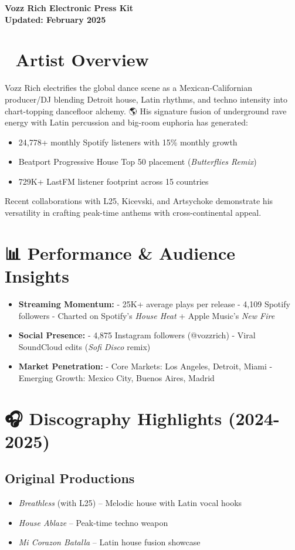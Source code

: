 \documentclass{article}
\begin{document}
  

{\centering\Large\bfseries Vozz Rich Electronic Press Kit \\  
\vspace{0.5em}  
\footnotesize Updated: February 2025\par}  

\section*{🎤 Artist Overview}  
Vozz Rich electrifies the global dance scene as a Mexican-Californian producer/DJ blending Detroit house, Latin rhythms, and techno intensity into chart-topping dancefloor alchemy. 🌎 His signature fusion of underground rave energy with Latin percussion and big-room euphoria has generated:  
\begin{itemize}  
\item 24,778+ monthly Spotify listeners with 15\% monthly growth  
\item Beatport Progressive House Top 50 placement (\textit{Butterflies Remix})  
\item 729K+ LastFM listener footprint across 15 countries  
\end{itemize}  
Recent collaborations with L25, Kicevski, and Artsychoke demonstrate his versatility in crafting peak-time anthems with cross-continental appeal.  

\section*{📊 Performance \& Audience Insights}  
\begin{itemize}  
\item \textbf{Streaming Momentum:}  
  - 25K+ average plays per release  
  - 4,109 Spotify followers  
  - Charted on Spotify's \textit{House Heat} + Apple Music's \textit{New Fire}  
\item \textbf{Social Presence:}  
  - 4,875 Instagram followers (@vozzrich)  
  - Viral SoundCloud edits (\textit{Sofi Disco} remix)  
\item \textbf{Market Penetration:}  
  - Core Markets: Los Angeles, Detroit, Miami  
  - Emerging Growth: Mexico City, Buenos Aires, Madrid  
\end{itemize}  

\section*{🎧 Discography Highlights (2024-2025)}  
\subsection*{Original Productions}  
\begin{itemize}  
\item \textit{Breathless} (with L25) – Melodic house with Latin vocal hooks  
\item \textit{House Ablaze} – Peak-time techno weapon  
\item \textit{Mi Corazon Batalla} – Latin house fusion showcase  
\end{itemize}  
\end{document}
